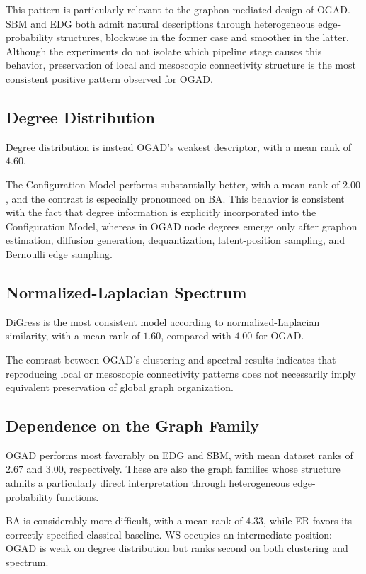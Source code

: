 This pattern is particularly relevant to the graphon-mediated design of OGAD. SBM and EDG both admit natural descriptions through heterogeneous edge-probability structures, blockwise in the former case and smoother in the latter. Although the experiments do not isolate which pipeline stage causes this behavior, preservation of local and mesoscopic connectivity structure is the most consistent positive pattern observed for OGAD.


\subsection{Degree Distribution}

Degree distribution is instead OGAD's weakest descriptor, with a mean rank of \(4.60\).

The Configuration Model performs substantially better, with a mean rank of \(2.00\), and the contrast is especially pronounced on BA. This behavior is consistent with the fact that degree information is explicitly incorporated into the Configuration Model, whereas in OGAD node degrees emerge only after graphon estimation, diffusion generation, dequantization, latent-position sampling, and Bernoulli edge sampling.


\subsection{Normalized-Laplacian Spectrum}

DiGress is the most consistent model according to normalized-Laplacian similarity, with a mean rank of \(1.60\), compared with \(4.00\) for OGAD.

The contrast between OGAD's clustering and spectral results indicates that reproducing local or mesoscopic connectivity patterns does not necessarily imply equivalent preservation of global graph organization.


\subsection{Dependence on the Graph Family}

OGAD performs most favorably on EDG and SBM, with mean dataset ranks of \(2.67\) and \(3.00\), respectively. These are also the graph families whose structure admits a particularly direct interpretation through heterogeneous edge-probability functions.

BA is considerably more difficult, with a mean rank of \(4.33\), while ER favors its correctly specified classical baseline. WS occupies an intermediate position: OGAD is weak on degree distribution but ranks second on both clustering and spectrum.


